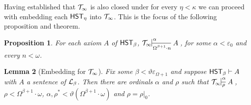\documentclass[UKenglish,cleveref,DIV=12]{scrartcl}
\newtheorem{lemma}{Lemma}
\newtheorem{proposition}[lemma]{Proposition}
\theoremstyle{definition}
\theoremstyle{definition}
\begin{document}
Having established that $\mathcal{T}_\infty$ is also closed under \Conec\eta for every
$\eta<\kappa$ we can proceed with embedding each $\mathsf{HST}_\eta$ into $\mathcal{T}_\infty$. This
is the focus of the following proposition and theorem.
\begin{proposition}\label{extprop:T8embed}
 For each axiom $A$ of $\mathsf{HST}_\beta$, $\Tinfty\prov\alpha{\Omega^{\beta+1}\cdot n}A$, for some $\alpha<\varepsilon_0$ and every $n<\omega$.
\end{proposition}
%
\begin{lemma}[Embedding  for $\mathcal{T}_\infty$]\label{extthm:T8Embed}
Fix some $\beta<\vartheta\varepsilon_{\Omega+1}$ and suppose $\mathsf{HST}_\beta\vdash A$ with $A$ a sentence of $\mathcal{L}_\beta$. Then there are ordinals $\alpha$ and $\rho$ such that $\Tinfty\prov\alpha\rho A$, $\rho<\Omega^{\beta+1}\cdot \omega$,  $\alpha,\rho^*<\vartheta(\Omega^{\beta+1}\cdot \omega)$ and $\rho=\rho|_0$.
\end{lemma}
\end{document}
